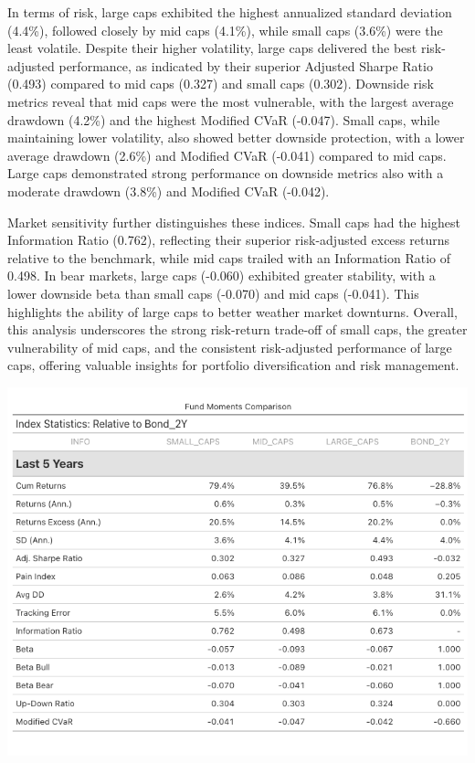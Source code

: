 \documentclass[12pt,preprint]{elsarticle}
\let\origfigure\figure
\let\endorigfigure\endfigure
\renewenvironment{figure}[1][2] {
    \expandafter\origfigure\expandafter[H]
} {
    \endorigfigure
}
\numberwithin{equation}{section}
\numberwithin{figure}{section}
\numberwithin{table}{section}
\begin{document}
In terms of risk, large caps exhibited the highest annualized standard
deviation (4.4\%), followed closely by mid caps (4.1\%), while small
caps (3.6\%) were the least volatile. Despite their higher volatility,
large caps delivered the best risk-adjusted performance, as indicated by
their superior Adjusted Sharpe Ratio (0.493) compared to mid caps
(0.327) and small caps (0.302). Downside risk metrics reveal that mid
caps were the most vulnerable, with the largest average drawdown (4.2\%)
and the highest Modified CVaR (-0.047). Small caps, while maintaining
lower volatility, also showed better downside protection, with a lower
average drawdown (2.6\%) and Modified CVaR (-0.041) compared to mid
caps. Large caps demonstrated strong performance on downside metrics
also with a moderate drawdown (3.8\%) and Modified CVaR (-0.042).

Market sensitivity further distinguishes these indices. Small caps had
the highest Information Ratio (0.762), reflecting their superior
risk-adjusted excess returns relative to the benchmark, while mid caps
trailed with an Information Ratio of 0.498. In bear markets, large caps
(-0.060) exhibited greater stability, with a lower downside beta than
small caps (-0.070) and mid caps (-0.041). This highlights the ability
of large caps to better weather market downturns. Overall, this analysis
underscores the strong risk-return trade-off of small caps, the greater
vulnerability of mid caps, and the consistent risk-adjusted performance
of large caps, offering valuable insights for portfolio diversification
and risk management.

\begin{figure}[H]

{\centering \includegraphics[width=0.8\linewidth]{tables/comp} 

}

\caption{Table 2: Descriptive Statistics \label{tab:Table2}}\label{fig:Table2}
\end{figure}
\end{document}
